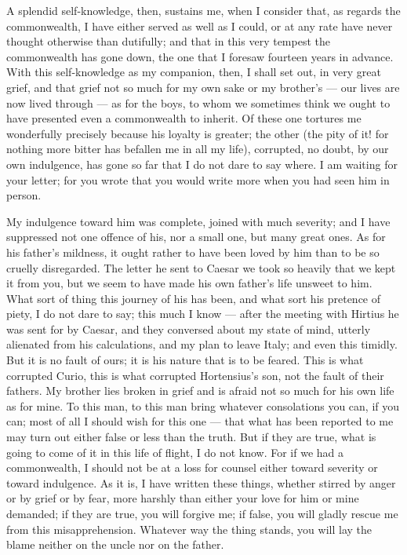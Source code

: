  A splendid self-knowledge, then, sustains me, when I consider that, as regards the commonwealth, I have either served as well as I could, or at any rate have never thought otherwise than dutifully; and that in this very tempest the commonwealth has gone down, the one that I foresaw fourteen years in advance. With this self-knowledge as my companion, then, I shall set out, in very great grief, and that grief not so much for my own sake or my brother's --- our lives are now lived through --- as for the boys, to whom we sometimes think we ought to have presented even a commonwealth to inherit. Of these one tortures me wonderfully precisely because his loyalty is greater; the other (the pity of it! for nothing more bitter has befallen me in all my life), corrupted, no doubt, by our own indulgence, has gone so far that I do not dare to say where. I am waiting for your letter; for you wrote that you would write more when you had seen him in person.

 My indulgence toward him was complete, joined with much severity; and I have suppressed not one offence of his, nor a small one, but many great ones. As for his father's mildness, it ought rather to have been loved by him than to be so cruelly disregarded. The letter he sent to Caesar we took so heavily that we kept it from you, but we seem to have made his own father's life unsweet to him. What sort of thing this journey of his has been, and what sort his pretence of piety, I do not dare to say; this much I know --- after the meeting with Hirtius he was sent for by Caesar, and they conversed about my state of mind, utterly alienated from his calculations, and my plan to leave Italy; and even this timidly. But it is no fault of ours; it is his nature that is to be feared. This is what corrupted Curio, this is what corrupted Hortensius's son, not the fault of their fathers. My brother lies broken in grief and is afraid not so much for his own life as for mine. To this man, to this man bring whatever consolations you can, if you can; most of all I should wish for this one --- that what has been reported to me may turn out either false or less than the truth. But if they are true, what is going to come of it in this life of flight, I do not know. For if we had a commonwealth, I should not be at a loss for counsel either toward severity or toward indulgence. As it is, I have written these things, whether stirred by anger or by grief or by fear, more harshly than either your love for him or mine demanded; if they are true, you will forgive me; if false, you will gladly rescue me from this misapprehension. Whatever way the thing stands, you will lay the blame neither on the uncle nor on the father.

